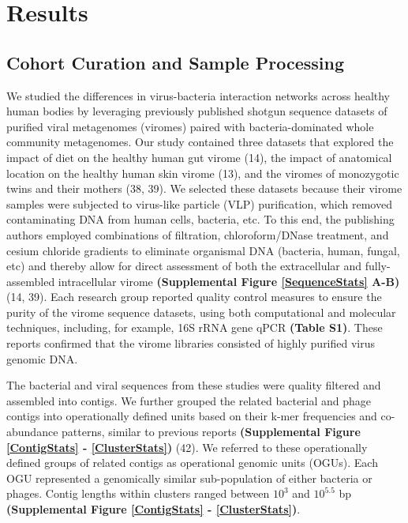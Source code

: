 \documentclass[12pt,]{article}
\begin{document}
\section{Results}\label{results}

\subsection{Cohort Curation and Sample
Processing}\label{cohort-curation-and-sample-processing}

We studied the differences in virus-bacteria interaction networks across
healthy human bodies by leveraging previously published shotgun sequence
datasets of purified viral metagenomes (viromes) paired with
bacteria-dominated whole community metagenomes. Our study contained
three datasets that explored the impact of diet on the healthy human gut
virome (14), the impact of anatomical location on the healthy human skin
virome (13), and the viromes of monozygotic twins and their mothers (38,
39). We selected these datasets because their virome samples were
subjected to virus-like particle (VLP) purification, which removed
contaminating DNA from human cells, bacteria, etc. To this end, the
publishing authors employed combinations of filtration, chloroform/DNase
treatment, and cesium chloride gradients to eliminate organismal DNA
(bacteria, human, fungal, etc) and thereby allow for direct assessment
of both the extracellular and fully-assembled intracellular virome
\textbf{(Supplemental Figure \ref{SequenceStats} A-B)} (14, 39). Each
research group reported quality control measures to ensure the purity of
the virome sequence datasets, using both computational and molecular
techniques, including, for example, 16S rRNA gene qPCR \textbf{(Table
S1)}. These reports confirmed that the virome libraries consisted of
highly purified virus genomic DNA.

The bacterial and viral sequences from these studies were quality
filtered and assembled into contigs. We further grouped the related
bacterial and phage contigs into operationally defined units based on
their k-mer frequencies and co-abundance patterns, similar to previous
reports \textbf{(Supplemental Figure \ref{ContigStats} -
\ref{ClusterStats})} (42). We referred to these operationally defined
groups of related contigs as operational genomic units (OGUs). Each OGU
represented a genomically similar sub-population of either bacteria or
phages. Contig lengths within clusters ranged between \(10^{3}\) and
\(10^{5.5}\) bp \textbf{(Supplemental Figure \ref{ContigStats} -
\ref{ClusterStats})}.
\end{document}
